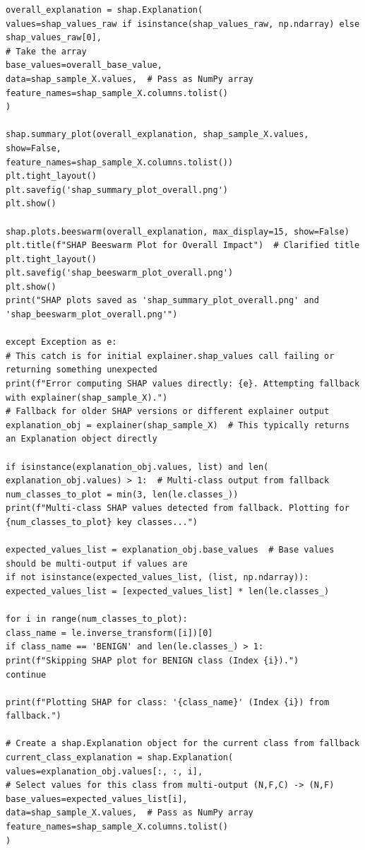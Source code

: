 \begin{lstlisting}[caption={Complete pipeline of XGBoost using CIC-IDS2017 in NIDS using Python}, label={lst:python-pipeline}]
overall_explanation = shap.Explanation(
values=shap_values_raw if isinstance(shap_values_raw, np.ndarray) else shap_values_raw[0],
# Take the array
base_values=overall_base_value,
data=shap_sample_X.values,  # Pass as NumPy array
feature_names=shap_sample_X.columns.tolist()
)

shap.summary_plot(overall_explanation, shap_sample_X.values, show=False,
feature_names=shap_sample_X.columns.tolist())
plt.tight_layout()
plt.savefig('shap_summary_plot_overall.png')
plt.show()

shap.plots.beeswarm(overall_explanation, max_display=15, show=False)
plt.title(f"SHAP Beeswarm Plot for Overall Impact")  # Clarified title
plt.tight_layout()
plt.savefig('shap_beeswarm_plot_overall.png')
plt.show()
print("SHAP plots saved as 'shap_summary_plot_overall.png' and 'shap_beeswarm_plot_overall.png'")

except Exception as e:
# This catch is for initial explainer.shap_values call failing or returning something unexpected
print(f"Error computing SHAP values directly: {e}. Attempting fallback with explainer(shap_sample_X).")
# Fallback for older SHAP versions or different explainer output
explanation_obj = explainer(shap_sample_X)  # This typically returns an Explanation object directly

if isinstance(explanation_obj.values, list) and len(
explanation_obj.values) > 1:  # Multi-class output from fallback
num_classes_to_plot = min(3, len(le.classes_))
print(f"Multi-class SHAP values detected from fallback. Plotting for {num_classes_to_plot} key classes...")

expected_values_list = explanation_obj.base_values  # Base values should be multi-output if values are
if not isinstance(expected_values_list, (list, np.ndarray)):
expected_values_list = [expected_values_list] * len(le.classes_)

for i in range(num_classes_to_plot):
class_name = le.inverse_transform([i])[0]
if class_name == 'BENIGN' and len(le.classes_) > 1:
print(f"Skipping SHAP plot for BENIGN class (Index {i}).")
continue

print(f"Plotting SHAP for class: '{class_name}' (Index {i}) from fallback.")

# Create a shap.Explanation object for the current class from fallback
current_class_explanation = shap.Explanation(
values=explanation_obj.values[:, :, i],
# Select values for this class from multi-output (N,F,C) -> (N,F)
base_values=expected_values_list[i],
data=shap_sample_X.values,  # Pass as NumPy array
feature_names=shap_sample_X.columns.tolist()
)


\end{lstlisting}
